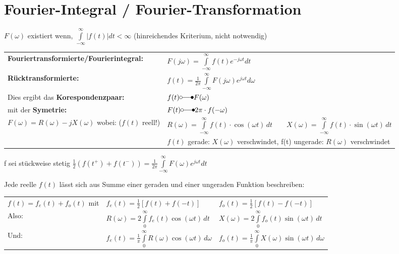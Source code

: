 \section{Fourier-Integral / Fourier-Transformation}
$F(\omega)$ existiert wenn, $\int\limits_{-\infty}^{\infty} |f(t)| dt < \infty$ (hinreichendes Kriterium, nicht notwendig) 

\begin{tabular}{|ll|}
\hline
\textbf{Fouriertransformierte/Fourierintegral:} &
$F(j\omega) = \int\limits_{-\infty}^{\infty} f(t)e^{-j\omega t}dt$ \\

\textbf{Rücktransformierte:} &
$f(t) = \frac{1}{2\pi}\int\limits_{-\infty}^{\infty}F(j\omega)e^{j\omega t}d\omega$ \\

Dies ergibt das \textbf{Korespondenzpaar:} & $f(t) \laplace F(\omega)$ \\
mit der \textbf{Symetrie:} & $F(t) \laplace 2\pi \cdot f(-\omega)$ \\

$F(\omega) = R(\omega) -jX(\omega)$ wobei: ($f(t)$ reell!) &
$R(\omega) = \int\limits_{-\infty}^\infty f(t)\cdot \cos(\omega t)\,dt \quad\quad X(\omega) =
\int\limits_{-\infty}^\infty f(t)\cdot \sin(\omega t)\,dt$
\\
&$f(t)$ gerade: $X(\omega)$ verschwindet, f(t) ungerade: $R(\omega)$ verschwindet \\
\hline
\end{tabular}

f sei stückweise stetig $\frac{1}{2}(f(t^+) + f(t^-)) = \frac{1}{2\pi} \int\limits_{-\infty}^{\infty}F(\omega)e^{j\omega t} dt$

Jede reelle $f(t)$ lässt sich aus Summe einer geraden und einer ungeraden Funktion beschreiben:\\
\begin{tabular}{lll}
$f(t) = f_e(t) + f_o(t)$ mit & $f_e(t) = \frac{1}{2}[f(t) + f(-t)]$ & $f_o(t) = \frac{1}{2}[f(t) - f(-t)]$ \\

Also: & $R(\omega) = 2 \int\limits_0^\infty f_e(t) \cos(\omega t)\,dt$ & $X(\omega) = 2 \int\limits_0^\infty
f_o(t) \sin(\omega t)\,dt$ \\

Und: & $f_e(t) = \frac{1}{\pi}\int\limits_0^\infty R(\omega)\cos(\omega t)\,d\omega$ & 
$f_o(t) = \frac{1}{\pi}\int\limits_0^\infty X(\omega)\sin(\omega t)\,d\omega$ \\
\end{tabular}

